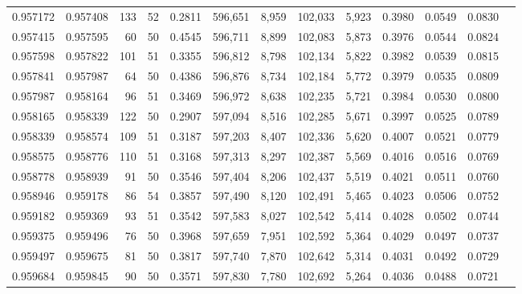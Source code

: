 \begin{tabular}{rrrrrrrrrrrrr}
0.957172 & 0.957408 &   133 &  52 &                                     0.2811 & 596,651 &   8,959 & 102,033 &   5,923 & 0.3980 & 0.0549 & 0.0830 \\
0.957415 & 0.957595 &    60 &  50 &                                     0.4545 & 596,711 &   8,899 & 102,083 &   5,873 & 0.3976 & 0.0544 & 0.0824 \\
0.957598 & 0.957822 &   101 &  51 &                                     0.3355 & 596,812 &   8,798 & 102,134 &   5,822 & 0.3982 & 0.0539 & 0.0815 \\
0.957841 & 0.957987 &    64 &  50 &                                     0.4386 & 596,876 &   8,734 & 102,184 &   5,772 & 0.3979 & 0.0535 & 0.0809 \\
0.957987 & 0.958164 &    96 &  51 &                                     0.3469 & 596,972 &   8,638 & 102,235 &   5,721 & 0.3984 & 0.0530 & 0.0800 \\
0.958165 & 0.958339 &   122 &  50 &                                     0.2907 & 597,094 &   8,516 & 102,285 &   5,671 & 0.3997 & 0.0525 & 0.0789 \\
0.958339 & 0.958574 &   109 &  51 &                                     0.3187 & 597,203 &   8,407 & 102,336 &   5,620 & 0.4007 & 0.0521 & 0.0779 \\
0.958575 & 0.958776 &   110 &  51 &                                     0.3168 & 597,313 &   8,297 & 102,387 &   5,569 & 0.4016 & 0.0516 & 0.0769 \\
0.958778 & 0.958939 &    91 &  50 &                                     0.3546 & 597,404 &   8,206 & 102,437 &   5,519 & 0.4021 & 0.0511 & 0.0760 \\
0.958946 & 0.959178 &    86 &  54 &                                     0.3857 & 597,490 &   8,120 & 102,491 &   5,465 & 0.4023 & 0.0506 & 0.0752 \\
0.959182 & 0.959369 &    93 &  51 &                                     0.3542 & 597,583 &   8,027 & 102,542 &   5,414 & 0.4028 & 0.0502 & 0.0744 \\
0.959375 & 0.959496 &    76 &  50 &                                     0.3968 & 597,659 &   7,951 & 102,592 &   5,364 & 0.4029 & 0.0497 & 0.0737 \\
0.959497 & 0.959675 &    81 &  50 &                                     0.3817 & 597,740 &   7,870 & 102,642 &   5,314 & 0.4031 & 0.0492 & 0.0729 \\
0.959684 & 0.959845 &    90 &  50 &                                     0.3571 & 597,830 &   7,780 & 102,692 &   5,264 & 0.4036 & 0.0488 & 0.0721 \\

\end{tabular}
